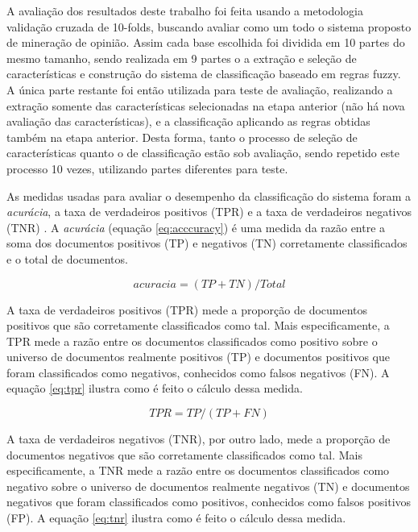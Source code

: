 \documentclass[template.tex]{subfiles}
\begin{document}
A avaliação dos resultados deste trabalho foi feita usando a metodologia validação cruzada de 10-folds, buscando avaliar como um todo o sistema proposto de mineração de opinião. Assim cada base escolhida foi dividida em 10 partes do mesmo tamanho, sendo realizada em 9 partes o a extração e seleção de características e construção do sistema de classificação baseado em regras fuzzy. A única parte restante foi então utilizada para teste de avaliação, realizando a extração somente das características selecionadas na etapa anterior (não há nova avaliação das características), e a classificação aplicando as regras obtidas também na etapa anterior. Desta forma, tanto o processo de seleção de características quanto o de classificação estão sob avaliação, sendo repetido este processo 10 vezes, utilizando partes diferentes para teste.


As medidas usadas para avaliar o desempenho da classificação do sistema foram a \textit{acurácia}, a taxa de verdadeiros positivos (TPR) e a taxa de verdadeiros negativos (TNR) \cite{garcia2012multi}. A \textit{acurácia} (equação \ref{eq:acccuracy}) é uma medida da razão entre a soma dos documentos positivos (TP) e negativos (TN) corretamente classificados e o total de documentos.

\begin{equation}
acuracia =  (TP + TN) / Total
\label{eq:acccuracy}
\end{equation}

A taxa de verdadeiros positivos (TPR) mede a proporção de documentos positivos que são corretamente classificados como tal. Mais especificamente, a TPR mede a razão entre os documentos classificados como positivo sobre o universo de documentos realmente positivos (TP) e documentos positivos que foram classificados como negativos, conhecidos como falsos negativos (FN). A equação \ref{eq:tpr} ilustra como é feito o cálculo dessa medida. 

\begin{equation}
TPR = TP / (TP + FN)
\label{eq:tpr}
\end{equation}

A taxa de verdadeiros negativos (TNR), por outro lado, mede a proporção de documentos negativos que são corretamente classificados como tal. Mais especificamente, a TNR mede a razão entre os documentos classificados como negativo sobre o universo de documentos realmente negativos (TN) e documentos negativos que foram classificados como positivos, conhecidos como falsos positivos (FP). A equação \ref{eq:tnr} ilustra como é feito o cálculo dessa medida. 
\end{document}
